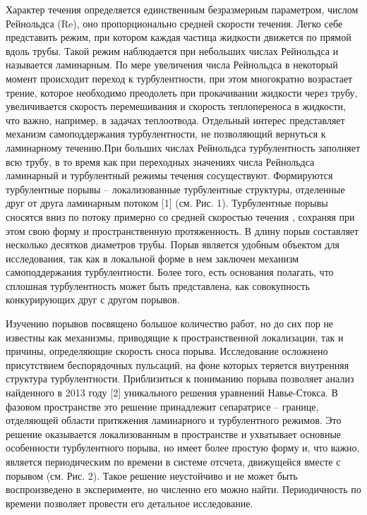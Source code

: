 Характер течения определяется единственным безразмерным параметром, числом Рейнольдса (Re), оно пропорционально средней скорости течения. Легко себе представить режим, при котором каждая частица жидкости движется по прямой вдоль трубы. Такой режим наблюдается при небольших числах Рейнольдса и называется ламинарным. По мере увеличения числа Рейнольдса в некоторый момент происходит переход к турбулентности, при этом многократно возрастает трение, которое необходимо преодолеть при прокачивании жидкости через трубу, увеличивается скорость перемешивания и скорость теплопереноса в жидкости, что важно, например, в задачах теплоотвода. Отдельный интерес представляет механизм самоподдержания турбулентности, не позволяющий вернуться к ламинарному течению.При больших числах Рейнольдса турбулентность заполняет всю трубу, в то время как при переходных значениях числа Рейнольдса ламинарный и турбулентный режимы течения сосуществуют. Формируются турбулентные порывы -- локализованные турбулентные структуры, отделенные друг от друга ламинарным потоком [1] (см. Рис. 1). Турбулентные порывы сносятся вниз по потоку примерно со средней скоростью течения , сохраняя при этом свою форму и пространственную протяженность. В длину порыв составляет несколько десятков диаметров трубы. Порыв является удобным объектом для исследования, так как в локальной форме в нем заключен механизм самоподдержания турбулентности. Более того, есть основания полагать, что сплошная турбулентность может быть представлена, как совокупность конкурирующих друг с другом порывов.

Изучению порывов посвящено большое количество работ, но до сих пор не известны как механизмы, приводящие к пространственной локализации, так и причины, определяющие скорость сноса порыва. Исследование осложнено присутствием беспорядочных пульсаций, на фоне которых теряется внутренняя структура турбулентности. Приблизиться к пониманию порыва позволяет анализ найденного в 2013 году [2] уникального решения уравнений Навье-Стокса. В фазовом пространстве это решение принадлежит сепаратрисе -- границе, отделяющей области притяжения ламинарного и турбулентного режимов. Это решение оказывается локализованным в пространстве и ухватывает основные особенности турбулентного порыва, но имеет более простую форму и, что важно, является периодическим по времени в системе отсчета, движущейся вместе с порывом (см. Рис. 2). Такое решение неустойчиво и не может быть воспроизведено в эксперименте, но численно его можно найти. Периодичность по времени позволяет провести его детальное исследование. 

